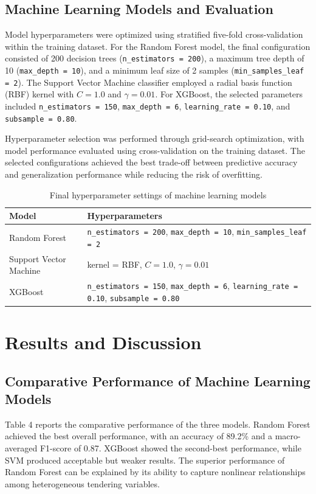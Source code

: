 \documentclass[twoside]{article}
\begin{document}
\subsection{Machine Learning Models and Evaluation}
Model hyperparameters were optimized using stratified five-fold cross-validation within the training dataset. For the Random Forest model, the final configuration consisted of 200 decision trees (\texttt{n\_estimators = 200}), a maximum tree depth of 10 (\texttt{max\_depth = 10}), and a minimum leaf size of 2 samples (\texttt{min\_samples\_leaf = 2}). The Support Vector Machine classifier employed a radial basis function (RBF) kernel with $C = 1.0$ and $\gamma = 0.01$. For XGBoost, the selected parameters included \texttt{n\_estimators = 150}, \texttt{max\_depth = 6}, \texttt{learning\_rate = 0.10}, and \texttt{subsample = 0.80}.

Hyperparameter selection was performed through grid-search optimization, with model performance evaluated using cross-validation on the training dataset. The selected configurations achieved the best trade-off between predictive accuracy and generalization performance while reducing the risk of overfitting.

\begin{table}[ht]
	\centering
	\caption{Final hyperparameter settings of machine learning models}
	\begin{tabular}{lp{10cm}}
		\hline
		Model & Hyperparameters \\
		\hline
		Random Forest & \texttt{n\_estimators = 200}, \texttt{max\_depth = 10}, \texttt{min\_samples\_leaf = 2} \\
		Support Vector Machine & kernel = RBF, $C = 1.0$, $\gamma = 0.01$ \\
		XGBoost & \texttt{n\_estimators = 150}, \texttt{max\_depth = 6}, \texttt{learning\_rate = 0.10}, \texttt{subsample = 0.80} \\
		\hline
	\end{tabular}
\end{table}

\section{Results and Discussion}
\subsection{Comparative Performance of Machine Learning Models}
Table 4 reports the comparative performance of the three models. Random Forest achieved the best overall performance, with an accuracy of 89.2\% and a macro-averaged F1-score of 0.87. XGBoost showed the second-best performance, while SVM produced acceptable but weaker results. The superior performance of Random Forest can be explained by its ability to capture nonlinear relationships among heterogeneous tendering variables.
\end{document}
